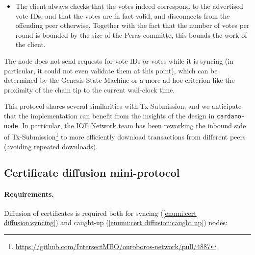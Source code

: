 \begin{itemize}
  However, then the node can not relay these votes, and a downstream peer might be missing exactly some of these votes to observe a quorum of votes by itself.
  Our design still handles this case directly by also running certificate diffusion between caught-up nodes (\cref{sec:certificate-diffusion}), but downloading and validating only a few votes is more efficient than transferring a certificate.\footnote{
  It is conceivable that in a variant of~\cite{peras-cert-report}, certificates will be only slightly larger than votes, in which case the difference in efficiency might be negligible.}
A compromise would be to stop downloading votes for the current round as soon as votes of weight larger than $\sigma$ have been observed, where $\perasQuorum < \sigma < 1$.
\item
  The client always checks that the votes indeed correspond to the advertised vote IDs, and that the votes are in fact valid, and disconnects from the offending peer otherwise.
  Together with the fact that the number of votes per round is bounded by the size of the Peras committe, this bounds the work of the client.
\end{itemize}
The node does not send requests for vote IDs or votes while it is syncing (in particular, it could not even validate them at this point), which can be determined by the Genesis State Machine \parencite{genesis-implementation-documentation} or a more ad-hoc criterion like the proximity of the chain tip to the current wall-clock time.

This protocol shares several similarities with Tx-Submission, and we anticipate that the implementation can benefit from the insights of the design in \texttt{cardano-node}.
In particular, the IOE Network team has been reworking the inbound side of Tx-Submission\footnote{\url{https://github.com/IntersectMBO/ouroboros-network/pull/4887}} to more efficiently download transactions from different peers (avoiding repeated downloads).

\subsection{Certificate diffusion mini-protocol}%
\label{sec:certificate-diffusion}

\paragraph{Requirements.}

Diffusion of certificates is required both for syncing (\ref{enumi:cert diffusion:syncing}) and caught-up (\ref{enumi:cert diffusion:caught up}) nodes:

